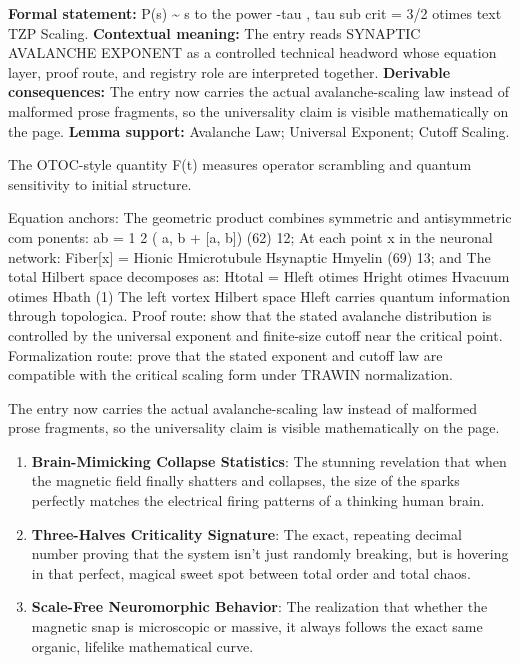 \begingroup\footnotesize\setlength{\emergencystretch}{3em}\sloppy
\textbf{Formal statement:} P(s) \textasciitilde{} s to the power -tau , tau sub crit = 3/2 otimes text TZP Scaling. \textbf{Contextual meaning:} The entry reads SYNAPTIC AVALANCHE EXPONENT as a controlled technical headword whose equation layer, proof route, and registry role are interpreted together. \textbf{Derivable consequences:} The entry now carries the actual avalanche-scaling law instead of malformed prose fragments, so the universality claim is visible mathematically on the page. \textbf{Lemma support:} Avalanche Law; Universal Exponent; Cutoff Scaling.\par
\endgroup

The OTOC-style quantity F(t) measures operator scrambling and quantum sensitivity to initial structure.

Equation anchors: The geometric product combines symmetric and antisymmetric com ponents: ab = 1 2 ( a, b + [a, b]) (62) 12; At each point x in the neuronal network: Fiber[x] = Hionic   Hmicrotubule   Hsynaptic   Hmyelin (69) 13; and The total Hilbert space decomposes as: Htotal = Hleft otimes Hright otimes Hvacuum otimes Hbath (1) The left vortex Hilbert space Hleft carries quantum information through topologica. Proof route: show that the stated avalanche distribution is controlled by the universal exponent and finite-size cutoff near the critical point. Formalization route: prove that the stated exponent and cutoff law are compatible with the critical scaling form under TRAWIN normalization.

The entry now carries the actual avalanche-scaling law instead of malformed prose fragments, so the universality claim is visible mathematically on the page.
\endgroup

\begin{enumerate}[leftmargin=1.6em,itemsep=6pt,topsep=4pt]
\item \textbf{Brain-Mimicking Collapse Statistics}: The stunning revelation that when the magnetic field finally shatters and collapses, the size of the sparks perfectly matches the electrical firing patterns of a thinking human brain.
\item \textbf{Three-Halves Criticality Signature}: The exact, repeating decimal number proving that the system isn't just randomly breaking, but is hovering in that perfect, magical sweet spot between total order and total chaos.
\item \textbf{Scale-Free Neuromorphic Behavior}: The realization that whether the magnetic snap is microscopic or massive, it always follows the exact same organic, lifelike mathematical curve.
\end{enumerate}

